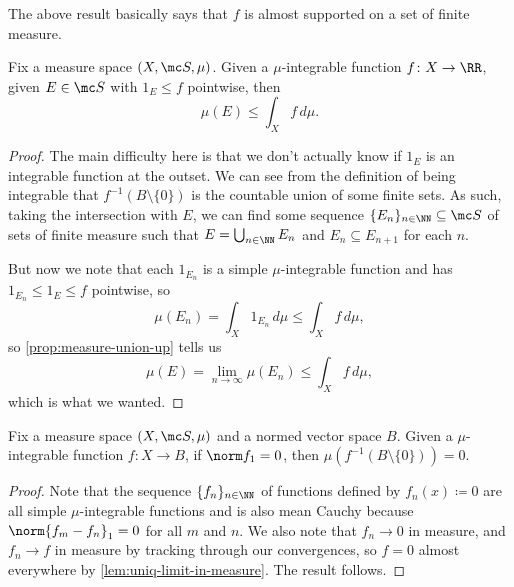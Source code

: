 \documentclass[../notes.tex]{subfiles}
\begin{document}
\begin{remark}
	The above result basically says that $f$ is almost supported on a set of finite measure.
\end{remark}
\begin{lemma}
	Fix a measure space $(X,\mc S,\mu)$. Given a $\mu$-integrable function $f\colon X\to\RR$, given $E\in\mc S$ with $1_E\le f$ pointwise, then
	\[\mu(E)\le\int_Xf\,d\mu.\]
\end{lemma}
\begin{proof}
	The main difficulty here is that we don't actually know if $1_E$ is an integrable function at the outset. We can see from the definition of being integrable that $f^{-1}(B\setminus\{0\})$ is the countable union of some finite sets. As such, taking the intersection with $E$, we can find some sequence $\{E_n\}_{n\in\NN}\subseteq\mc S$ of sets of finite measure such that $E=\bigcup_{n\in\NN}E_n$ and $E_n\subseteq E_{n+1}$ for each $n$.

	But now we note that each $1_{E_n}$ is a simple $\mu$-integrable function and has $1_{E_n}\le1_E\le f$ pointwise, so
	\[\mu(E_n)=\int_X1_{E_n}\,d\mu\le\int_Xf\,d\mu,\]
	so \autoref{prop:measure-union-up} tells us
	\[\mu(E)=\lim_{n\to\infty}\mu(E_n)\le\int_Xf\,d\mu,\]
	which is what we wanted.
\end{proof}
\begin{lemma}
	Fix a measure space $(X,\mc S,\mu)$ and a normed vector space $B$. Given a $\mu$-integrable function $f\colon X\to B$, if $\norm f_1=0$, then $\mu\left(f^{-1}(B\setminus\{0\})\right)=0$.
\end{lemma}
\begin{proof}
	Note that the sequence $\{f_n\}_{n\in\NN}$ of functions defined by $f_n(x)\coloneqq0$ are all simple $\mu$-integrable functions and is also mean Cauchy because $\norm{f_m-f_n}_1=0$ for all $m$ and $n$. We also note that $f_n\to0$ in measure, and $f_n\to f$ in measure by tracking through our convergences, so $f=0$ almost everywhere by \autoref{lem:uniq-limit-in-measure}. The result follows.
\end{proof}
\end{document}
